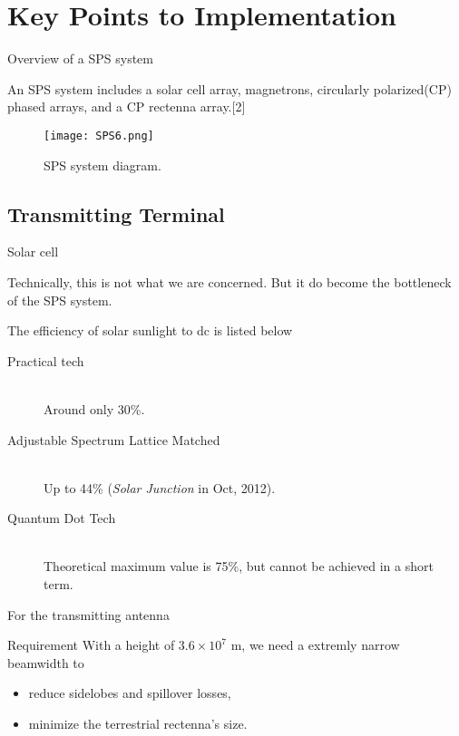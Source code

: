 \documentclass{beamer}
\begin{document}
\section{Key Points to Implementation}
\begin{frame}[label=spsovv]{Overview of a SPS system}
  \begin{block}{}
    An SPS system includes a solar cell array, magnetrons, circularly
    polarized(CP) phased arrays, and a CP rectenna array.[2]
  \end{block}

  \begin{figure}[H]
    \centering
    \texttt{[image: SPS6.png]}
    \caption{SPS system diagram.\cite{MPTHMSP}}
  \end{figure}
\end{frame}


\subsection{Transmitting Terminal}

\begin{frame}[label=sc]{Solar cell}
  \begin{block}{}
  Technically, this is not what we are concerned.
  But it do become the bottleneck of the SPS system.
  \end{block}
  The efficiency of solar sunlight to dc is listed below \pause
  \begin{description}
    \item[Practical tech] \hfill \\
      Around only 30\%.\pause
    \item[Adjustable Spectrum Lattice Matched] \hfill \\
      Up to 44\% (\emph{Solar Junction} in Oct, 2012).\pause
    \item[Quantum Dot Tech] \hfill \\
      Theoretical maximum value is 75\%,
      but cannot be achieved in a short term.\pause
  \end{description}
\end{frame}

\begin{frame}[label=bwdth]{For the transmitting antenna}
  \begin{block}{Requirement}
    With a height of $3.6\times 10^7$ m, we need a extremly narrow
    beamwidth to
    \pause
    \begin{itemize}
    \item reduce sidelobes and spillover losses, \pause
    \item minimize the terrestrial rectenna's size.
    \end{itemize}
  \end{block}
  \begin{figure}[H]
    \centering
  \end{figure}
\end{frame}
\end{document}
